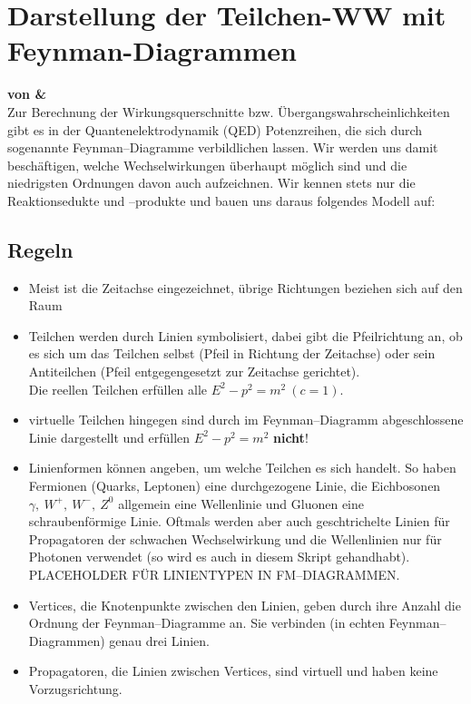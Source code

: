 \documentclass[Ex4_Zusammenfassung.tex]{subfiles}
\begin{document}
\section{Darstellung der Teilchen-WW mit Feynman-Diagrammen}
\textbf{von \soeren \& \martina}\\

Zur Berechnung der Wirkungsquerschnitte bzw. Übergangswahrscheinlichkeiten gibt es in der Quantenelektrodynamik (QED) Potenzreihen, die sich durch sogenannte Feynman--Diagramme verbildlichen lassen. Wir werden uns damit beschäftigen, welche Wechselwirkungen überhaupt möglich sind und die niedrigsten Ordnungen davon auch aufzeichnen. Wir kennen stets nur die Reaktionsedukte und --produkte und bauen uns daraus folgendes Modell auf:  

\subsection{Regeln}
	
	\begin{itemize}
		\item Meist ist die Zeitachse eingezeichnet, übrige Richtungen beziehen sich auf den Raum
		
		\item Teilchen werden durch Linien symbolisiert, dabei gibt die Pfeilrichtung an, ob es sich um das Teilchen selbst 	(Pfeil in Richtung der Zeitachse) oder sein Antiteilchen (Pfeil entgegengesetzt zur Zeitachse gerichtet).\\
		Die reellen Teilchen erfüllen alle $E^2 - p^2 = m^2\ (c=1)$. 
		
		\item virtuelle Teilchen hingegen sind durch im Feynman--Diagramm abgeschlossene Linie dargestellt und erfüllen $E^2 - p^2 = m^2$ \textbf{nicht}!
		
		\item Linienformen können angeben, um welche Teilchen es sich handelt. So haben Fermionen (Quarks, Leptonen) eine durchgezogene Linie, die Eichbosonen $\gamma,\ W^+,\ W^-,\ Z^0$ allgemein eine Wellenlinie und Gluonen eine schraubenförmige Linie. Oftmals werden aber auch geschtrichelte Linien für Propagatoren der schwachen Wechselwirkung und die Wellenlinien nur für Photonen verwendet (so wird es auch in diesem Skript gehandhabt).\\
		PLACEHOLDER FÜR LINIENTYPEN IN FM--DIAGRAMMEN.\\
		
		\item Vertices, die Knotenpunkte zwischen den Linien, geben durch ihre Anzahl die Ordnung der Feynman--Diagramme an. Sie verbinden (in echten Feynman--Diagrammen) genau drei Linien. 
		
		\item Propagatoren, die Linien zwischen Vertices, sind virtuell und haben keine Vorzugsrichtung.
	\end{itemize}
\end{document}
